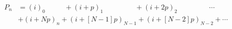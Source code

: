 \documentclass[preview]{standalone}
\begin{document}
\begin{align*}
P_n &= (i)_0\:\:\:\:\:\:\:\:\:\:\:\:+(i+p)_1\:\:\:\:\:\:\:\:\:\:\:\:\:\:\:\:\:\:\:\:+(i+2p)_2\:\:\:\:\:\:\:\:\:\:\:\:\:\:\:\:\:\:\:\:\cdots\\&+(i+Np)_n+(i+[N-1]p)_{N-1}+(i+[N-2]p)_{N-2}+\cdots
\end{align*}
\end{document}
